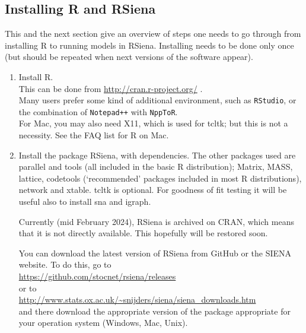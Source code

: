\documentclass[a4paper,fleqn,11pt]{article}
\newcommand{\+}{\, + \,}
\newcommand{\sfn}[1]{\textsf{#1}}
\newcommand{\R}{{\sf R }}
\newcommand{\Rn}{{\sf R}}
\newcommand{\rs}{{\sf RSiena}}
\newcommand{\RS}{{\sf \textsf{RSiena} }}
\newcommand{\SI}{{\sf SIENA }}
\begin{document}
\subsection{Installing \R and \RS }
\label{S_use}
\noindent
This and the next section give an overview of steps one needs to go through from
installing \R to running models in \rs.
Installing needs to be done only once (but should be repeated when next versions
of the software appear).

\begin{enumerate}
	\item	Install \Rn.\\
            This can be done from \url{http://cran.r-project.org/} .\\
            Many users prefer some kind of additional environment, such as \texttt{RStudio}, or
            the combination of \texttt{Notepad++} with \texttt{NppToR}.\\
            For Mac, you may also need \sfn{X11}, which is
            used for \sfn{tcltk}; but this is not a necessity. See the FAQ list for R on Mac.
	\item	Install the package \rs, with dependencies.
            The other packages used are  \sfn{parallel}
            and \sfn{tools} (all included in the basic \R distribution);
            \sfn{Matrix}, \sfn{MASS}, \sfn{lattice}, \sfn{codetools}
            (`recommended' packages included in most R distributions),
            \sfn{network} and \sfn{xtable}. \sfn{tcltk} is optional.
            For goodness of fit testing it will be useful also to
            install \sfn{sna} and \sfn{igraph}.

            Currently (mid February 2024), \RS is archived on CRAN,
            which means that it is not directly available.
            This hopefully will be restored soon.

            You can download
            the latest version of \RS
            from GitHub or the \SI website.
            To do this, go to\\
            \url{https://github.com/stocnet/rsiena/releases}\\
            or to\\
              \url{http://www.stats.ox.ac.uk/~snijders/siena/siena_downloads.htm}\\
            and there download the appropriate version of the package
            appropriate for your operation system (Windows, Mac, Unix).


\end{enumerate}
\end{document}
